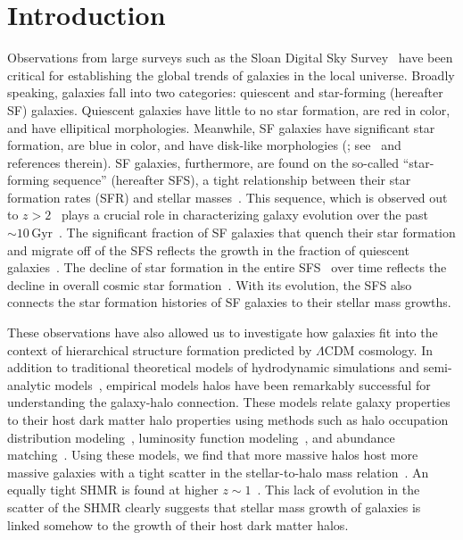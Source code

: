 \documentclass[12pt, letterpaper, preprint, tighten]{aastex62}
\begin{document}
\section{Introduction}
Observations from large surveys such as the Sloan Digital Sky Survey~\citep[SDSS;][]{york2000} 
have been critical for establishing the global trends of galaxies in 
the local universe. Broadly speaking, galaxies fall into two categories: 
quiescent and star-forming (hereafter SF) galaxies. Quiescent galaxies 
have little to no star formation, are red in color, and have ellipitical 
morphologies. Meanwhile, SF galaxies have significant star formation, are blue 
in color, and have disk-like morphologies (\citealt{kauffmann2003, blanton2003, baldry2006, taylor2009, moustakas2013}; 
see~\citealt{blanton2009} and references therein). 
SF galaxies, furthermore, are found on the so-called ``star-forming sequence'' 
(hereafter SFS), a tight relationship between their star formation rates (SFR) 
and stellar masses~\citep[][see also Figure~\ref{fig:groupcat}]{noeske2007, daddi2007, salim2007, speagle2014, lee2015}.
This sequence, which is observed out to $z > 2$~\citep{wang2013, leja2015} 
plays a crucial role in characterizing galaxy evolution over the past ${\sim}10\,\mathrm{Gyr}$~\citep[see][for an alternative point of view]{kelson2014,abramson2016}. 
The significant fraction of SF galaxies that quench their 
star formation and migrate off of the SFS reflects the growth in the 
fraction of quiescent galaxies~\citep{blanton2006, borch2006, bundy2006, moustakas2013}. 
The decline of star formation in the entire SFS~\citep{lee2015, schreiber2015} 
over time reflects the decline in overall cosmic star formation~\citep{hopkins2006, behroozi2013, madau2014}.
With its evolution, the SFS also connects the star formation histories of SF 
galaxies to their stellar mass growths.

These observations have also allowed us to investigate how galaxies fit 
into the context of hierarchical structure formation predicted
by $\Lambda$CDM cosmology. In addition to traditional theoretical 
models of hydrodynamic simulations and semi-analytic 
models~\citep[see][for reviews]{silk2012, somerville2015}, 
empirical models halos have been remarkably successful for 
understanding the galaxy-halo connection. These models relate galaxy 
properties to their host dark matter halo properties using methods such as 
halo occupation distribution modeling~\citep[HOD; \emph{e.g.}][]{zheng2007,zehavi2011,leauthaud2012,parejko2013,zu2015}, 
luminosity function modeling~\citep[\emph{e.g.}][]{yang2009}, and abundance 
matching~\citep[\emph{e.g.}][]{kravtsov2004, vale2006, conroy2009, moster2013, reddick2013}.
Using these models, we find that more massive halos host more 
massive galaxies with a tight scatter in the stellar-to-halo 
mass relation~\citep[hereafter SHMR;][]{mandelbaum2006a, conroy2007, more2011, leauthaud2012, tinker2013, velander2014, han2015, zu2015, gu2016, lange2018a}. An equally tight SHMR is found at higher 
$z\sim1$~\citep{leauthaud2012, tinker2013, patel2015}. This lack of
evolution in the scatter of the SHMR clearly suggests that stellar 
mass growth of galaxies is linked somehow to the growth 
of their host dark matter halos.
\end{document}
